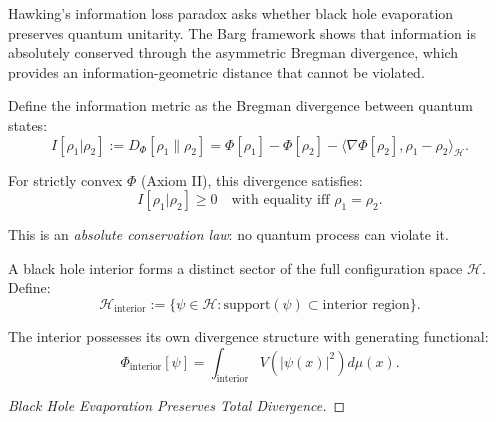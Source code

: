\begin{theorem}
\label{thm:informationPreservation}

Hawking's information loss paradox asks whether black hole evaporation preserves quantum unitarity. The Barg framework shows that information is absolutely conserved through the asymmetric Bregman divergence, which provides an information-geometric distance that cannot be violated.

\begin{definition}

Define the information metric as the Bregman divergence between quantum states:
\begin{equation}
I[\rho_1 | \rho_2] := D_{\Phi}[\rho_1 \| \rho_2] = \Phi[\rho_1] - \Phi[\rho_2] - \langle \nabla\Phi[\rho_2], \rho_1 - \rho_2 \rangle_{\mathcal{H}}.
\end{equation}

For strictly convex $\Phi$ (Axiom II), this divergence satisfies:
\begin{equation}
I[\rho_1 | \rho_2] \geq 0 \quad \text{with equality iff } \rho_1 = \rho_2.
\end{equation}

This is an \emph{absolute conservation law}: no quantum process can violate it.

\end{definition}

\begin{theorem}
\label{thm:blackHoleInterior}

A black hole interior forms a distinct sector of the full configuration space $\mathcal{H}$. Define:
\begin{equation}
\mathcal{H}_{\text{interior}} := \{\psi \in \mathcal{H} : \text{support}(\psi) \subset \text{interior region}\}.
\end{equation}

The interior possesses its own divergence structure with generating functional:
\begin{equation}
\Phi_{\text{interior}}[\psi] = \int_{\text{interior}} V(|\psi(x)|^2) d\mu(x).
\end{equation}

\end{theorem}

\begin{proof}[Black Hole Evaporation Preserves Total Divergence]


\end{proof}
\end{theorem}
